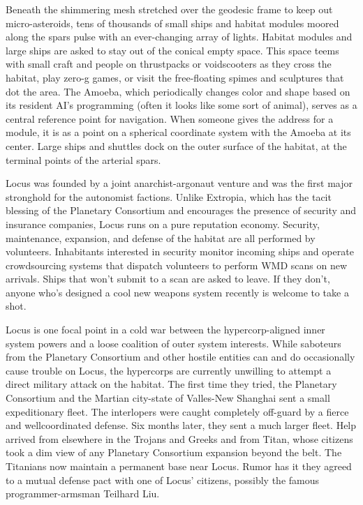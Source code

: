 Beneath the shimmering mesh stretched over the geodesic frame to keep out micro-asteroids, tens of thousands of small ships and habitat modules moored along the spars pulse with an ever-changing array of lights. Habitat modules and large ships are asked to stay out of the conical empty space. This space teems with small craft and people on thrustpacks or voidscooters as they cross the habitat, play zero-g games, or visit the free-floating spimes and sculptures that dot the area. The Amoeba, which periodically changes color and shape based on its resident AI's programming (often it looks like some sort of animal), serves as a central reference point for navigation. When someone gives the address for a module, it is as a point on a spherical coordinate system with the Amoeba at its center. Large ships and shuttles dock on the outer surface of the habitat, at the terminal points of the arterial spars. 

Locus was founded by a joint anarchist-argonaut venture and was the first major stronghold for the autonomist factions. Unlike Extropia, which has the tacit blessing of the Planetary Consortium and encourages the presence of security and insurance companies, Locus runs on a pure reputation economy. Security, maintenance, expansion, and defense of the habitat are all performed by volunteers. Inhabitants interested in security monitor incoming ships and operate crowdsourcing systems that dispatch volunteers to perform WMD scans on new arrivals. Ships that won't submit to a scan are asked to leave. If they don't, anyone who's designed a cool new weapons system recently is welcome to take a shot. 

Locus is one focal point in a cold war between the hypercorp-aligned inner system powers and a loose coalition of outer system interests. While saboteurs from the Planetary Consortium and other hostile entities can and do occasionally cause trouble on Locus, the hypercorps are currently unwilling to attempt a direct military attack on the habitat. The first time they tried, the Planetary Consortium and the Martian city-state of Valles-New Shanghai sent a small expeditionary fleet. The interlopers were caught completely off-guard by a fierce and wellcoordinated defense. Six months later, they sent a much larger fleet. Help arrived from elsewhere in the Trojans and Greeks and from Titan, whose citizens took a dim view of any Planetary Consortium expansion beyond the belt. The Titanians now maintain a permanent base near Locus. Rumor has it they agreed to a mutual defense pact with one of Locus' citizens, possibly the famous programmer-armsman Teilhard Liu. 

